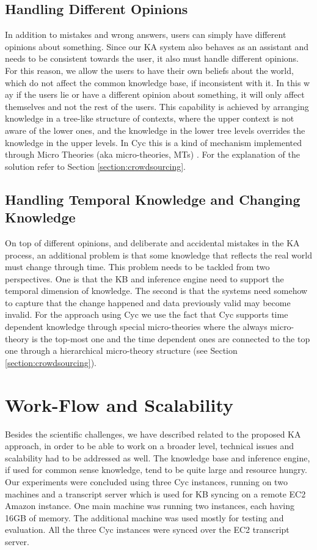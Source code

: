 \subsection{Handling Different Opinions}
In addition to mistakes and wrong answers, users can simply have different 
opinions about something. Since our KA system also behaves as an assistant and 
needs to be consistent towards the user, it also must handle different opinions. 
For this reason, we allow the users to have their own beliefs about the world, 
which do not affect the common knowledge base, if inconsistent with it. In this w
ay if the users lie or have a different opinion about something, it will only 
affect themselves and not the rest of the users. This capability is achieved by 
arranging knowledge in a tree-like structure of contexts, where the upper 
context is not aware of the lower ones, and the knowledge in the lower tree 
levels overrides the knowledge in the upper levels. In Cyc this is a kind of 
mechanism implemented through Micro Theories (aka micro-theories, MTs)
\parencite{Kleer2013}. For the explanation of the solution refer to 
Section \ref{section:crowdsourcing}. 

\subsection{Handling Temporal Knowledge and Changing Knowledge}
On top of different opinions, and deliberate and accidental mistakes in the 
KA process, an additional problem is that some knowledge that reflects the real 
world must change through time. This problem needs to be tackled from two 
perspectives. One is that the KB and inference engine need to support the 
temporal dimension of knowledge. The second is that the systems need somehow to 
capture that the change happened and data previously valid may become invalid. 
For the approach using Cyc we use the fact that Cyc supports time dependent 
knowledge through special micro-theories where the always micro-theory is the 
top-most one and the time dependent ones are connected to the top one through 
a hierarchical micro-theory structure (see Section \ref{section:crowdsourcing}). 

\section{Work-Flow and Scalability}
Besides the scientific challenges, we have described related to the proposed 
KA approach, in order to be able to work on a broader level, technical issues 
and scalability had to be addressed as well. The knowledge base and inference 
engine, if used for common sense knowledge, tend to be quite large and resource 
hungry. Our experiments were concluded using three Cyc instances, running on 
two machines and a transcript server which is used for KB syncing on a remote 
EC2 Amazon instance. One main machine was running two instances, each having 
16GB of memory. The additional machine was used mostly for testing and 
evaluation. All the three Cyc instances were synced over the EC2 
transcript server.

